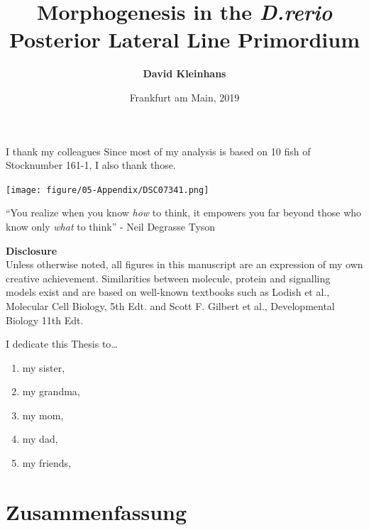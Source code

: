 \documentclass[11pt,singlespacinge,twoside]{reedthesis} %
\title{\textbf{Morphogenesis in the \emph{D.rerio} Posterior Lateral Line Primordium}}
\author{\textbf{David Kleinhans}}
\date{Frankfurt am Main, 2019}
\def\labelenumi{\arabic{enumi}.}
\begin{document}
  \maketitle

\frontmatter %
\pagestyle{empty} %
  \begin{acknowledgements}
    I thank my colleagues
    Since most of my analysis is based on 10 fish of Stocknumber 161-1, I also thank those.
\begin{center}
\texttt{[image: figure/05-Appendix/DSC07341.png]}
\end{center}
  \end{acknowledgements}
  \begin{preface}
    ``You realize when you know \emph{how} to think, it empowers you far beyond those who know only \emph{what} to think'' - Neil Degrasse Tyson
  \end{preface}
  \hypersetup{linkcolor=black}
  \setcounter{tocdepth}{2}
  \tableofcontents

  \listoftables

  \listoffigures
  \vfill
  \begin{center}
    \textbf{Disclosure}\\
    {Unless otherwise noted, all figures in this manuscript are an expression of my own creative achievement. Similarities between molecule, protein and signalling models exist and are based on well-known textbooks such as Lodish et al., Molecular Cell Biology, 5th Edt. and Scott F. Gilbert et al., Developmental Biology 11th Edt.}
  \end{center}
  \begin{dedication}
    I dedicate this Thesis to\ldots{}
    \begin{enumerate}
    \def\labelenumi{\arabic{enumi}.}
    \item
      my sister,
    \item
      my grandma,
    \item
      my mom,
    \item
      my dad,
    \item
      my friends,
    \end{enumerate}
  \end{dedication}
\mainmatter %
\pagestyle{fancyplain} %

\hypertarget{zusammenfassung}{%
\chapter*{Zusammenfassung}\label{zusammenfassung}}
\end{document}
